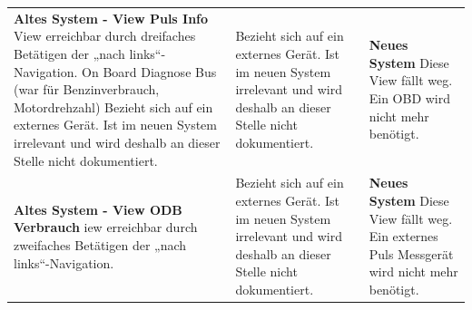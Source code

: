 \begin{longtable}{p{4.4cm} p{3cm} p{4.4cm}}
	\textbf{Altes System -  View Puls Info} \newline 
	View erreichbar durch dreifaches Betätigen der „nach links“-Navigation. \newline
On Board Diagnose Bus (war für Benzinverbrauch, Motordrehzahl)	Bezieht sich auf ein externes Gerät. Ist im neuen System irrelevant und wird deshalb an dieser Stelle nicht dokumentiert.
	& \newline \newline Bezieht sich auf ein externes Gerät. Ist im neuen System irrelevant und wird deshalb an dieser Stelle nicht dokumentiert.  
	&\textbf{Neues System} \newline
Diese View fällt weg. Ein OBD wird nicht mehr benötigt.\\
	
	\textbf{Altes System -   View ODB Verbrauch} \newline 
	iew erreichbar durch zweifaches Betätigen der „nach links“-Navigation. 
	& \newline \newline Bezieht sich auf ein externes Gerät. Ist im neuen System irrelevant und wird deshalb an dieser Stelle nicht dokumentiert.
	&\textbf{Neues System} \newline
Diese View fällt weg. Ein externes Puls Messgerät wird nicht mehr benötigt.\\



\end{longtable}
